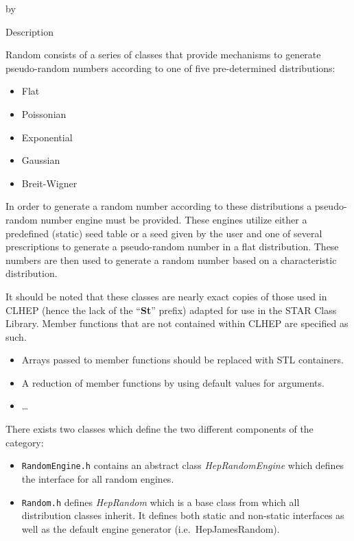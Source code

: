 \documentclass[twoside]{article}
\newcommand{\comp}[1]{\texttt{#1}}%
\newcommand{\entrylabel}[1]{\mbox{\textbf{{#1}}}\hfil}%
\newenvironment{entry}
{\begin{list}{}%
    {\renewcommand{\makelabel}{\entrylabel}%
     \setlength{\labelwidth}{90pt}%
     \setlength{\leftmargin}{\labelwidth}
     \advance\leftmargin by \labelsep%
      }%
    }%
  {\end{list}}
\newcommand{\Entrylabel}[1]%
{\raisebox{0pt}[1ex][0pt]{\makebox[\labelwidth][l]%
    {\parbox[t]{\labelwidth}{\hspace{0pt}\textbf{{#1}}}}}}
\newenvironment{Entry}%
{\renewcommand{\entrylabel}{\Entrylabel}\begin{entry}}%
  {\end{entry}}
\begin{document}
\begin{description}
\begin{Entry}
\item[Description]   

  Random consists of a series of classes that provide mechanisms to
  generate pseudo-random numbers according to one of five pre-determined
  distributions:
  \begin{itemize}
   \item Flat
   \item Poissonian
   \item Exponential
   \item Gaussian
   \item Breit-Wigner
  \end{itemize}

  In order to generate a random number according to these distributions
  a pseudo-random number engine must be provided.  These engines
  utilize either a predefined (static) seed table 
  or a seed given by the user and one of several prescriptions
  to generate a pseudo-random
  number in a flat distribution.  These numbers are then used to generate
  a random number based on a characteristic distribution.
  
  It should be noted that these classes are nearly exact copies of those
  used in CLHEP (hence the lack of the ``{\bf St}'' prefix)
  adapted for use in the STAR Class Library.  Member functions that
  are not contained within CLHEP are specified as such.
  
  \begin{itemize}
    \item Arrays passed to member functions should be replaced with
      STL containers.
    \item A reduction of member functions by using default values for
      arguments.
    \item \ldots
  \end{itemize}
  
  There exists two classes which define the two different components
  of the category:
  \begin{itemize}
    \item \comp{RandomEngine.h} contains an abstract class {\em HepRandomEngine}
      which defines the interface for all random engines.
    \item \comp{Random.h} defines  {\em HepRandom} which is a base class
      from which all distribution classes inherit.  It defines both
      static and non-static interfaces as well as the default engine
      generator (i.e.~HepJamesRandom).
    \end{itemize}
    

\end{Entry}
\end{description}
\end{document}
